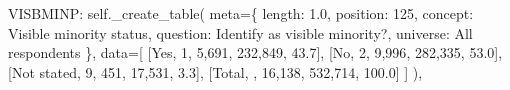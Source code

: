 \documentclass[
  11pt,
  a4paper,
]{article}
\newenvironment{Shaded}{\begin{snugshade}}{\end{snugshade}}
\newcommand{\NormalTok}[1]{\textcolor[rgb]{0.00,0.23,0.31}{#1}}
\newcommand{\OperatorTok}[1]{\textcolor[rgb]{0.37,0.37,0.37}{#1}}
\newcommand{\StringTok}[1]{\textcolor[rgb]{0.13,0.47,0.30}{#1}}
\newcommand{\VariableTok}[1]{\textcolor[rgb]{0.07,0.07,0.07}{#1}}
\begin{document}
\begin{Shaded}
\begin{Highlighting}[]
            \StringTok{\textquotesingle{}VISBMINP\textquotesingle{}}\NormalTok{: }\VariableTok{self}\NormalTok{.\_create\_table(}
\NormalTok{                meta}\OperatorTok{=}\NormalTok{\{}
                    \StringTok{\textquotesingle{}length\textquotesingle{}}\NormalTok{: }\StringTok{\textquotesingle{}1.0\textquotesingle{}}\NormalTok{, }\StringTok{\textquotesingle{}position\textquotesingle{}}\NormalTok{: }\StringTok{\textquotesingle{}125\textquotesingle{}}\NormalTok{,}
                    \StringTok{\textquotesingle{}concept\textquotesingle{}}\NormalTok{: }\StringTok{\textquotesingle{}Visible minority status\textquotesingle{}}\NormalTok{,}
                    \StringTok{\textquotesingle{}question\textquotesingle{}}\NormalTok{: }\StringTok{\textquotesingle{}Identify as visible minority?\textquotesingle{}}\NormalTok{,}
                    \StringTok{\textquotesingle{}universe\textquotesingle{}}\NormalTok{: }\StringTok{\textquotesingle{}All respondents\textquotesingle{}}
\NormalTok{                \},}
\NormalTok{                data}\OperatorTok{=}\NormalTok{[}
\NormalTok{                    [}\StringTok{\textquotesingle{}Yes\textquotesingle{}}\NormalTok{, }\StringTok{\textquotesingle{}1\textquotesingle{}}\NormalTok{, }\StringTok{\textquotesingle{}5,691\textquotesingle{}}\NormalTok{, }\StringTok{\textquotesingle{}232,849\textquotesingle{}}\NormalTok{, }\StringTok{\textquotesingle{}43.7\textquotesingle{}}\NormalTok{],}
\NormalTok{                    [}\StringTok{\textquotesingle{}No\textquotesingle{}}\NormalTok{, }\StringTok{\textquotesingle{}2\textquotesingle{}}\NormalTok{, }\StringTok{\textquotesingle{}9,996\textquotesingle{}}\NormalTok{, }\StringTok{\textquotesingle{}282,335\textquotesingle{}}\NormalTok{, }\StringTok{\textquotesingle{}53.0\textquotesingle{}}\NormalTok{],}
\NormalTok{                    [}\StringTok{\textquotesingle{}Not stated\textquotesingle{}}\NormalTok{, }\StringTok{\textquotesingle{}9\textquotesingle{}}\NormalTok{, }\StringTok{\textquotesingle{}451\textquotesingle{}}\NormalTok{, }\StringTok{\textquotesingle{}17,531\textquotesingle{}}\NormalTok{, }\StringTok{\textquotesingle{}3.3\textquotesingle{}}\NormalTok{],}
\NormalTok{                    [}\StringTok{\textquotesingle{}Total\textquotesingle{}}\NormalTok{, }\StringTok{\textquotesingle{}\textquotesingle{}}\NormalTok{, }\StringTok{\textquotesingle{}16,138\textquotesingle{}}\NormalTok{, }\StringTok{\textquotesingle{}532,714\textquotesingle{}}\NormalTok{, }\StringTok{\textquotesingle{}100.0\textquotesingle{}}\NormalTok{]}
\NormalTok{                ]}
\NormalTok{            ),}
            

\end{Highlighting}
\end{Shaded}
\end{document}
